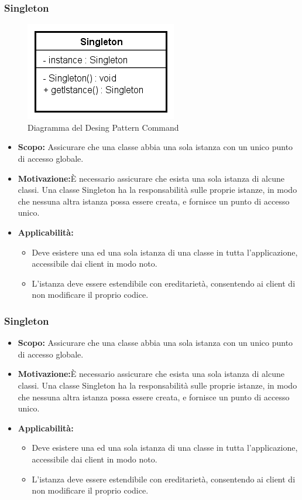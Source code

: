 \documentclass[a4paper]{article}
\begin{document}
	\subsubsection{Singleton}
				\begin{figure}[H]
					\centering
					\includegraphics[scale=0.65]{immagini/ST/schemaSingleton.png}
					\caption{Diagramma del Desing Pattern Command}
				\end{figure}
		\begin{itemize}
			\item \textbf{Scopo:} Assicurare che una classe abbia una sola istanza con un unico punto di accesso globale.
			\item \textbf{Motivazione:}È necessario assicurare che esista una sola istanza di alcune classi. Una classe Singleton ha la responsabilità sulle proprie istanze, in modo che nessuna altra istanza possa essere creata, e fornisce un punto di accesso unico.
			\item \textbf{Applicabilità:}
			\begin{itemize}
				\item Deve esistere una ed una sola istanza di una classe in tutta l'applicazione, accessibile dai client in modo noto.
				\item L'istanza deve essere estendibile con ereditarietà, consentendo ai client di non modificare il proprio codice.
			\end{itemize}
		\end{itemize}
		
		
	\subsubsection{Singleton}
		\begin{itemize}
			\item \textbf{Scopo:} Assicurare che una classe abbia una sola istanza con un unico punto di accesso globale.
			\item \textbf{Motivazione:}È necessario assicurare che esista una sola istanza di alcune classi. Una classe Singleton ha la responsabilità sulle proprie istanze, in modo che nessuna altra istanza possa essere creata, e fornisce un punto di accesso unico.
			\item \textbf{Applicabilità:}
			\begin{itemize}
				\item Deve esistere una ed una sola istanza di una classe in tutta l'applicazione, accessibile dai client in modo noto.
				\item L'istanza deve essere estendibile con ereditarietà, consentendo ai client di non modificare il proprio codice.
			\end{itemize}
		\end{itemize}
	
	\cleardoublepage
	\listoffigures
	
	\cleardoublepage
	\listoftables
		
\end{document}
